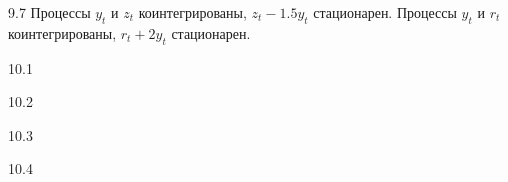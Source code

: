 \protect \hypertarget {soln:9.7}{}
\begin{solution}{{9.7}}
Процессы $y_t$ и $z_t$ коинтегрированы, $z_t - 1.5y_t$ стационарен.
Процессы $y_t$ и $r_t$ коинтегрированы, $r_t + 2y_t$ стационарен.
\end{solution}
\protect \hypertarget {soln:10.1}{}
\begin{solution}{{10.1}}
\end{solution}
\protect \hypertarget {soln:10.2}{}
\begin{solution}{{10.2}}
\end{solution}
\protect \hypertarget {soln:10.3}{}
\begin{solution}{{10.3}}
\end{solution}
\protect \hypertarget {soln:10.4}{}
\begin{solution}{{10.4}}
\end{solution}
